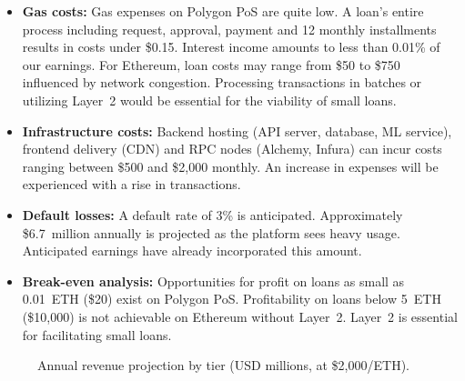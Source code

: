 \documentclass[12pt,a4paper]{report}
\begin{document}
\begin{itemize}[noitemsep]
\item \textbf{Gas costs:} Gas expenses on Polygon PoS are quite low. A loan's entire process including request, approval, payment and 12 monthly installments results in costs under \$0.15. Interest income amounts to less than 0.01\% of our earnings. For Ethereum, loan costs may range from \$50 to \$750 influenced by network congestion. Processing transactions in batches or utilizing Layer~2 would be essential for the viability of small loans.
\item \textbf{Infrastructure costs:} Backend hosting (API server, database, ML service), frontend delivery (CDN) and RPC nodes (Alchemy, Infura) can incur costs ranging between \$500 and \$2,000 monthly. An increase in expenses will be experienced with a rise in transactions.
\item \textbf{Default losses:} A default rate of 3\% is anticipated. Approximately \$6.7~million annually is projected as the platform sees heavy usage. Anticipated earnings have already incorporated this amount.
\item \textbf{Break-even analysis:} Opportunities for profit on loans as small as 0.01~ETH (\$20) exist on Polygon PoS. Profitability on loans below 5~ETH (\$10,000) is not achievable on Ethereum without Layer~2. Layer~2 is essential for facilitating small loans.
\end{itemize}

\begin{figure}[H]
\centering
{}
\caption{Annual revenue projection by tier (USD millions, at \$2{,}000/ETH).}
\end{figure}
\end{document}

